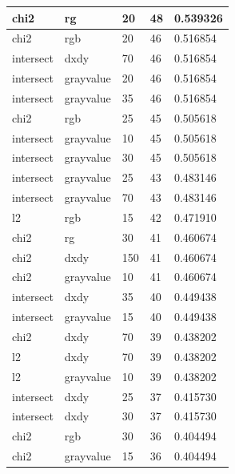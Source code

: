 \documentclass{article}
\begin{document}
\begin{longtable}{|l|l|l|l|l|}
    chi2          & rg             & 20       & 48      & 0.539326 \\ \hline
    chi2          & rgb            & 20       & 46      & 0.516854 \\ \hline
    intersect     & dxdy           & 70       & 46      & 0.516854 \\ \hline
    intersect     & grayvalue      & 20       & 46      & 0.516854 \\ \hline
    intersect     & grayvalue      & 35       & 46      & 0.516854 \\ \hline
    chi2          & rgb            & 25       & 45      & 0.505618 \\ \hline
    intersect     & grayvalue      & 10       & 45      & 0.505618 \\ \hline
    intersect     & grayvalue      & 30       & 45      & 0.505618 \\ \hline
    intersect     & grayvalue      & 25       & 43      & 0.483146 \\ \hline
    intersect     & grayvalue      & 70       & 43      & 0.483146 \\ \hline
    l2            & rgb            & 15       & 42      & 0.471910 \\ \hline
    chi2          & rg             & 30       & 41      & 0.460674 \\ \hline
    chi2          & dxdy           & 150      & 41      & 0.460674 \\ \hline
    chi2          & grayvalue      & 10       & 41      & 0.460674 \\ \hline
    intersect     & dxdy           & 35       & 40      & 0.449438 \\ \hline
    intersect     & grayvalue      & 15       & 40      & 0.449438 \\ \hline
    chi2          & dxdy           & 70       & 39      & 0.438202 \\ \hline
    l2            & dxdy           & 70       & 39      & 0.438202 \\ \hline
    l2            & grayvalue      & 10       & 39      & 0.438202 \\ \hline
    intersect     & dxdy           & 25       & 37      & 0.415730 \\ \hline
    intersect     & dxdy           & 30       & 37      & 0.415730 \\ \hline
    chi2          & rgb            & 30       & 36      & 0.404494 \\ \hline
    chi2          & grayvalue      & 15       & 36      & 0.404494 \\ \hline

\end{longtable}
\end{document}
